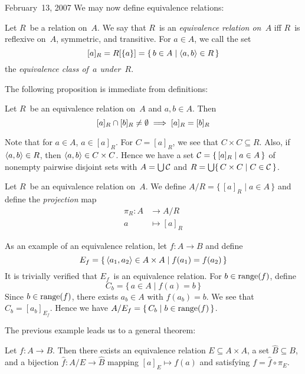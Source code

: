\begin{lecture}{February~13, 2007}
We may now define equivalence relations:
\begin{defn}
Let \(R\)~be a relation on~\(A\). We say that \(R\)~is an \emph{equivalence relation on~\(A\)} iff \(R\)~is reflexive on~\(A\), symmetric, and transitive. For \(a\in A\), we call the set
\[[a]_R=R[\{a\}]=\{\,b\in A\mid \langle{a},{b}\rangle\in R\,\}\]
the \emph{equivalence class of~\(a\) under~\(R\)}.
\end{defn}
\noindent The following proposition is immediate from definitions:
\begin{prop}
Let \(R\)~be an equivalence relation on~\(A\) and \(a,b\in A\). Then
\[[a]_R\cap[b]_R\ne\emptyset\implies [a]_R=[b]_R\]
\end{prop}
\noindent Note that for \(a\in A\), \(a\in[a]_R\). For \(C=[a]_R\), we see that \(C\times C\subseteq R\). Also, if \(\langle{a},{b}\rangle\in R\), then \(\langle{a},{b}\rangle\in C\times C\). Hence we have a set \(\mathcal{C}=\{\,[a]_R\mid a\in A\,\}\) of nonempty pairwise disjoint sets with \(A=\bigcup\mathcal{C}\) and \(R=\bigcup\{\,C\times C\mid C\in\mathcal{C}\,\}\).
\begin{defn}
Let \(R\)~be an equivalence relation on~\(A\). We define \(A/R=\{\,[a]_R\mid a\in A\,\}\) and define the \emph{projection} map
\begin{align*}
\pi_R:A&\to A/R\\
		a&\mapsto[a]_R
\end{align*}
\end{defn}
\begin{example}
As an example of an equivalence relation, let \(f:A\to B\) and define
\[E_f=\{\,\langle{a_1},{a_2}\rangle\in A\times A\mid f(a_1)=f(a_2)\,\}\]
It is trivially verified that \(E_f\)~is an equivalence relation. For \(b\in\operatorname{range}(f)\), define
\[C_b=\{\,a\in A\mid f(a)=b\,\}\]
Since \(b\in\operatorname{range}(f)\), there exists \(a_b\in A\) with \(f(a_b)=b\). We see that \(C_b=[a_b]_{E_f}\). Hence we have \(A/E_f=\{\,C_b\mid b\in\operatorname{range}(f)\,\}\).
\end{example}
\noindent The previous example leads us to a general theorem:
\begin{thm}
Let \(f:A\to B\). Then there exists an equivalence relation \(E\subseteq A\times A\), a set \(\widehat{B}\subseteq B\), and a bijection \(\widehat{f}:A/E\to\widehat{B}\) mapping \([a]_E\mapsto f(a)\) and satisfying \(f=\widehat{f}\circ\pi_E\).
\end{thm}


\end{lecture}
